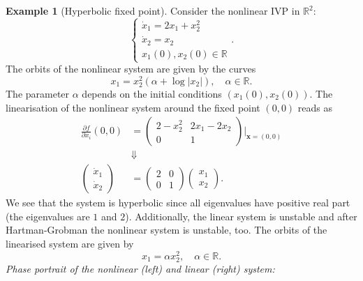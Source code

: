 \documentclass[hidelinks,a4paper, 11pt]{article}
\theoremstyle{plain}
\theoremstyle{break}
\theoremstyle{plain}
\theoremstyle{definition}
\newtheorem*{example}{Example}
\begin{document}
\begin{example}[Hyperbolic fixed point]
	Consider the nonlinear IVP in $\mathbb R^2$:
	\[
		\begin{cases}
		\dot x_1 = 2x_1 + x_2^2 \\
		\dot x_2 = x_2 \\
		x_1(0), x_2(0) \in \mathbb R
		\end{cases}.
	\]
	The orbits of the nonlinear system are given by the curves
	\[
		x_1 = x_2^2 (\alpha + \log|x_2|), \quad \alpha \in \mathbb R.
	\]
	The parameter $\alpha$ depends on the initial conditions $(x_1(0), x_2(0))$. The linearisation of the nonlinear system around the fixed point $(0,0)$ reads as
	\begin{align*}
		\frac{\partial f}{\partial x_i}(0,0) &= \begin{pmatrix}
			2 - x_2^2 & 2x_1-2x_2 \\
			0 & 1
		\end{pmatrix} \Bigg \vert_{\mathbf x =(0,0)} \\
		&\Downarrow  \\
		\begin{pmatrix}
			\dot x_1 \\ \dot x_2
		\end{pmatrix} &= 
		\begin{pmatrix}
			2 & 0 \\ 0 & 1
		\end{pmatrix} \begin{pmatrix}
		x_1 \\ x_2
		\end{pmatrix}.
	\end{align*}
	We see that the system is hyperbolic since all eigenvalues have positive real part (the eigenvalues are $1$ and $2$). Additionally, the linear system is unstable and after Hartman-Grobman the nonlinear system is unstable, too. The orbits of the linearised system are given by
	\[
		x_1 = \alpha x_2^2, \quad \alpha \in \mathbb R.
	\]
	\textit{Phase portrait of the nonlinear (left) and linear (right) system:}
	

\end{example}
\end{document}
